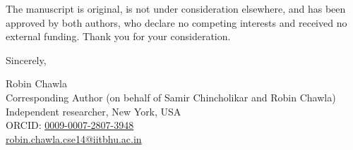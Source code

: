 \documentclass[11pt]{article}
\begin{document}
The manuscript is original, is not under consideration elsewhere, and has been approved by both authors, who declare no competing interests and received no external funding. Thank you for your consideration.

\vspace{12pt}
\noindent Sincerely,

\vspace{2pt}
\noindent Robin Chawla\\
Corresponding Author (on behalf of Samir Chincholikar and Robin Chawla)\\
Independent researcher, New York, USA\\
ORCID: \href{https://orcid.org/0009-0007-2807-3948}{0009-0007-2807-3948}\\
\href{mailto:robin.chawla.cse14@iitbhu.ac.in}{robin.chawla.cse14@iitbhu.ac.in}
\end{document}
